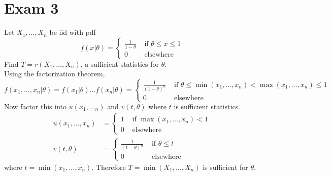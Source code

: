 \documentclass[12pt]{article}
\begin{document}
\section{Exam 3} 

\begin{question} Let $X_1,\dots,X_n$ be iid with pdf $$f(x | \theta ) = \begin{cases} \frac{1}{1-\theta} &\text{ if } \theta \leq x \leq 1 \\ 0 &\text{ elsewhere } \end{cases} $$ 
Find $T = r(X_1,\dots,X_n)$, a sufficient statistics for $\theta$.  \\
Using the factorization theorem, $$ f(x_1,\dots,x_n |\theta) = f(x_1 | \theta) \dots f(x_n | \theta) = \begin{cases} \frac{1}{(1-\theta)^n} &\text{ if } \theta \leq \min(x_1,\dots,x_n) < \max(x_1,\dots,x_n) \leq 1 \\ 0 &\text{ elsewhere } \end{cases} $$ 
Now factor this into $u(x_1,\dots_n)$ and $v(t, \theta)$ where $t$ is sufficient statistics. $$ \begin{aligned} u(x_1,\dots,x_n) &= \begin{cases} 1 &\text{ if } \max(x_1,\dots,x_n) < 1 \\ 0 &\text{ elsewhere } \end{cases} \\ v(t,\theta) &= \begin{cases} \frac{1}{(1-\theta)^n} &\text{ if } \theta \leq t \\ 0 &\text{ elsewhere } \end{cases} \end{aligned} $$ where $t = \min(x_1,\dots,x_n)$. Therefore $T = \min(X_1,\dots,X_n)$ is sufficient for $\theta$. 

\end{question} 
\end{document}
